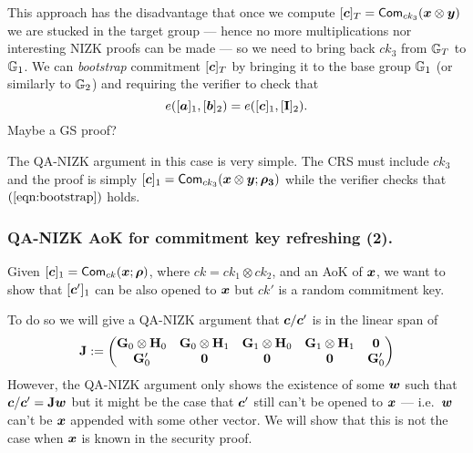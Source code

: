 This approach has the disadvantage that once we compute $[{\boldsymbol{c}}]_T=\allowbreak\mathsf{Com}_{ck_3}({\boldsymbol{x}}\otimes{\boldsymbol{y}})$ we are stucked in the target group --- hence no more multiplications nor interesting NIZK proofs can be made --- so we need to bring back $ck_3$ from $\mathbb{G}_T$ to $\mathbb{G}_1$. We can \emph{bootstrap} commitment $[{\boldsymbol{c}}]_T$  by bringing it to the base group $\mathbb{G}_1$ (or similarly to $\mathbb{G}_2$) and requiring the verifier to check that
\begin{equation}
e([{\boldsymbol{a}}]_1,[{\boldsymbol{b}}]_2)=e([{\boldsymbol{c}}]_1,[\mathbf{{I}}]_{2}).\label{eqn:bootstrap}
\end{equation}
{\color{red} Maybe a GS proof? }

The QA-NIZK argument in this case is very simple. The CRS must include $ck_3$ and the proof is simply $[{\boldsymbol{c}}]_1=\mathsf{Com}_{ck_3}({\boldsymbol{x}}\otimes{\boldsymbol{y}};{\boldsymbol{\rho_3}})$ while the verifier checks that $(\ref{eqn:bootstrap})$ holds.
%
%

\subsubsection{QA-NIZK AoK for commitment key refreshing (2).}
Given $[{\boldsymbol{c}}]_1=\allowbreak\mathsf{Com}_{ck}({\boldsymbol{x}};\allowbreak {\boldsymbol{\rho}})$, where $ck = ck_1\otimes ck_2$, and an AoK of ${\boldsymbol{x}}$, we want to show that $[{\boldsymbol{c}}']_1$ can be also opened to ${\boldsymbol{x}}$ but $ck'$ is a random commitment key.

To do so we will give a QA-NIZK argument that ${\boldsymbol{c}}/{\boldsymbol{c}}'$ is in the linear span of
$$
\mathbf{{J}}:=
\begin{pmatrix}
\mathbf{{G}}_0\otimes\mathbf{{H}}_0 & \mathbf{{G}}_0\otimes\mathbf{{H}}_1 & \mathbf{{G}}_1\otimes\mathbf{{H}}_0& \mathbf{{G}}_1\otimes\mathbf{{H}}_1 & \mathbf{{0}}\\
\mathbf{{G}}'_0 & \mathbf{{0}} & \mathbf{{0}} & \mathbf{{0}} & \mathbf{{G}}'_0 
\end{pmatrix}
$$
However, the QA-NIZK argument only shows the existence of some ${\boldsymbol{w}}$ such that ${\boldsymbol{c}}/{\boldsymbol{c}}' = \mathbf{{J}}{\boldsymbol{w}}$ but it might be the case that ${\boldsymbol{c}}'$ still can't be opened to ${\boldsymbol{x}}$ --- i.e.~${\boldsymbol{w}}$ can't be ${\boldsymbol{x}}$ appended with some other vector. We will show that this is not the case when ${\boldsymbol{x}}$ is known in the security proof.

